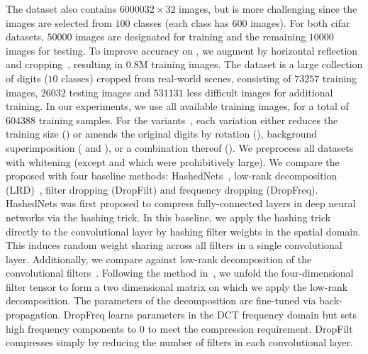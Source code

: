 \documentclass{article} %
\begin{document}
The  dataset also contains $60000$$32\times32$ images, but is more challenging since the images are selected from $100$ classes (each class has 600 images). 
For both {\sc cifar} datasets, $50000$ images are designated for training and the remaining $10000$ images for testing. 
To improve accuracy on , we augment by horizontal reflection and cropping~\cite{krizhevsky2012imagenet}, resulting in $0.8$M training images.
The  dataset is a large collection of digits ($10$ classes) cropped from real-world scenes, consisting of $73257$ training images, $26032$ testing images and $531131$ less difficult images for additional training.
In our experiments, we use all available training images, for a total of $604388$ training samples.
For the  variants~\cite{larochelle2007empirical}, each variation either reduces the training size ({}) or amends the original digits by rotation ({}), background superimposition ({} and {}), or a combination thereof ({}). 
We preprocess all datasets with whitening (except  and  which were prohibitively large).%
We compare the proposed \abbrev{} with four baseline methods:
HashedNets~\cite{chen2015compressing}, low-rank decomposition (LRD)~\cite{denil2013predicting}, filter dropping (DropFilt) and frequency dropping (DropFreq).
HashedNets was first proposed to compress fully-connected layers in deep neural networks via the hashing trick.
In this baseline, we apply the hashing trick directly to the convolutional layer by hashing filter weights in the spatial domain.
This induces random weight sharing across all filters in a single convolutional layer.
Additionally, we compare against low-rank decomposition of the convolutional filters~\cite{denil2013predicting}.
Following the method in~\cite{denton2014exploiting}, we unfold the four-dimensional filter tensor to form a two dimensional matrix on which we apply the low-rank decomposition.
The parameters of the decomposition are fine-tuned via back-propagation.
DropFreq learns parameters in the DCT frequency domain but sets high frequency components to $0$ to meet the compression requirement.
DropFilt compresses simply by reducing the number of filters in each convolutional layer.
\end{document}
